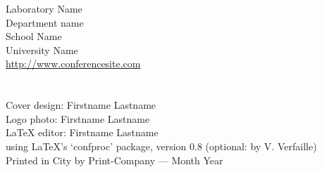 \documentclass[letterpaper,%
  10pt,%
  twoside,%
  twosidepapers,%
  electronic,%
  binding=0mm,%
  papers=final,%
  headers=exceptpdf,%
  bib=backref,%
  paperselec=all,%
  onecoltoc,%
  tocnum=left,%
  twocolbib,%
  threecolindex,%
  checktitle=false,%
  checkauthor=false,%
  showpapernumber=false,%
  movepagenumber=false,%
  showmarginlines=false,%
  colorheaders=black,%
  debug=false,%
  verbose=false,%
  pdftk=true,%
  hyperref={bookmarksdepth=1,bookmarksopen,bookmarksopenlevel=0,%
    linkcolor=colorforlink,urlcolor=colorforurl}, %
  geometry={text={175truemm,226truemm},%
    inner=0.805in,top=29.15mm,bottom=24.5mm,footskip=9.68mm,voffset=-5mm},%
  ]{confproc}
\author{\procpdfauthor}
\title{\DAFxname\\ \DAFxaddress}
\date{\DAFxdate}
\renewcommand{\contentsname}{Day-by-Day Conference Program}
\newcommand{\PICTPATH}{pictures/}
\begin{document}
\frontmatter
\setcounter{page}{1}
\maketitle
\renewcommand{\contentsname}{\texorpdfstring{}{Conference Program}}
\newpage
\vspace*{1.7cm}
\thispagestyle{empty}
\\ Laboratory Name\\ Department name\\
School Name\\ University Name\\
\url{http://www.conferencesite.com}\\
\vspace*{0.15cm}\newline
{}\\
\vspace*{0.35cm}\newline
{}\\
Cover design: Firstname Lastname\\
Logo photo: Firstname Lastname\\
\LaTeX{} editor: Firstname Lastname\\
using \LaTeX's `confproc' package, version 0.8 (optional: by V. Verfaille)\\
\vspace*{0.35cm}\newline
\noindent  Printed in City by Print-Company --- Month Year
\otherpagestyle
\clearsingleordoublepage
\vspace*{0.6cm}
\thisotherpagestyle
{}
\end{document}
